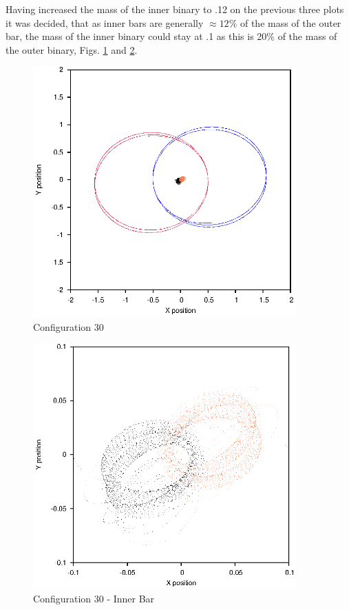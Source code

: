 \documentclass[a4paper,12pt]{article}
\begin{document}
Having increased the mass of the inner binary to .12 on the previous three plots it was decided, that as inner bars are generally $\approx12\%$ of the mass of the outer bar, the mass of the inner binary could stay at .1
as this is 20\% of the mass of the outer binary, Figs. \ref{fig:config30} and \ref{fig:config30i}.
\begin{figure}[H]
\centering
\includegraphics[width=0.9\textwidth]{./2017results/1-1-1-1/Orbit.eps}
\caption{Configuration 30}
\label{fig:config30}
\end{figure}
\begin{figure}[H]
\centering
\includegraphics[width=0.9\textwidth]{./2017results/1-1-1-1/Inner.eps}
\caption{Configuration 30 - Inner Bar}
\label{fig:config30i}
\end{figure}
\end{document}
